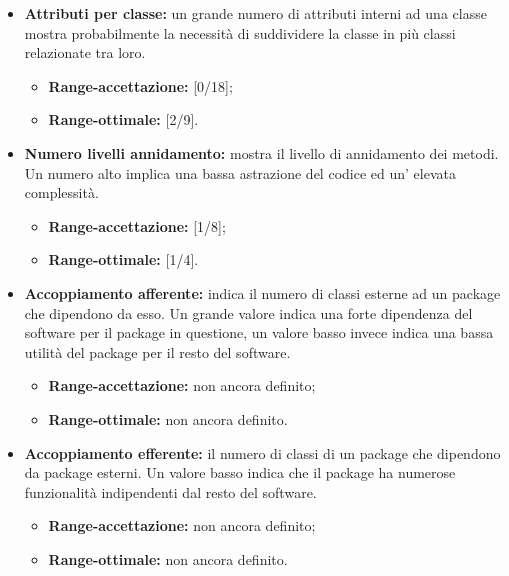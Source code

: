 		\begin{itemize}
			\item \textbf{Attributi per classe: }un grande numero di attributi interni ad una classe mostra probabilmente la necessità di suddividere la classe in più classi relazionate tra loro.
			
			\begin{itemize}
				\item \textbf{Range-accettazione: }[0/18];
				\item \textbf{Range-ottimale: }[2/9].
			\end{itemize}
			
			\item \textbf{Numero livelli annidamento: }mostra il livello di annidamento dei metodi. Un numero alto implica una bassa astrazione del codice ed un' elevata complessità.
			
			\begin{itemize}
				\item \textbf{Range-accettazione: }[1/8];
				\item \textbf{Range-ottimale: }[1/4].
			\end{itemize}
			
			\item \textbf{Accoppiamento afferente: }indica il numero di classi esterne ad un package che dipendono da esso. Un grande valore indica una forte dipendenza del software per il package in questione, un valore basso invece indica una bassa utilità del package per il resto del software.
			
			\begin{itemize}
				\item \textbf{Range-accettazione: }non ancora definito;
				\item \textbf{Range-ottimale: }non ancora definito.
			\end{itemize}
			
			\item \textbf{Accoppiamento efferente: }il numero di classi di un package che dipendono da package esterni. Un valore basso indica che il package ha numerose funzionalità indipendenti dal resto del software.
			
			\begin{itemize}
				\item \textbf{Range-accettazione: }non ancora definito;
				\item \textbf{Range-ottimale: }non ancora definito.
			\end{itemize}
			

\end{itemize}
